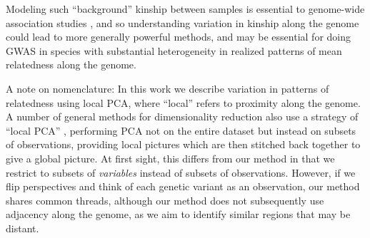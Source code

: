 \documentclass[11pt, oneside]{article}   	%
\begin{document}
Modeling such ``background'' kinship between samples
is essential to genome-wide association studies \citep[GWAS,][]{price2006principal,astle2009population},
and so understanding variation in kinship along the genome 
could lead to more generally powerful methods,
and may be essential for doing GWAS in species with substantial heterogeneity in realized patterns of mean relatedness along the genome.



A note on nomenclature: In this work we describe variation in patterns of relatedness using local PCA,
where ``local'' refers to proximity along the genome.
A number of general methods for dimensionality reduction also use a strategy of ``local PCA''
\citep[e.g.,][]{manjon2013diffusion,kambhatla1997dimension,weingessel2000local,roweis2000nonlinear},
performing PCA not on the entire dataset but instead on subsets of observations,
providing local pictures which are then stitched back together to give a global picture.
At first sight,
this differs from our method in that we restrict to subsets of \emph{variables} instead of subsets of observations.
However, if we flip perspectives and think of each genetic variant as an observation,
our method shares common threads, although 
our method does not subsequently use adjacency along the genome,
as we aim to identify similar regions that may be distant.
\end{document}
